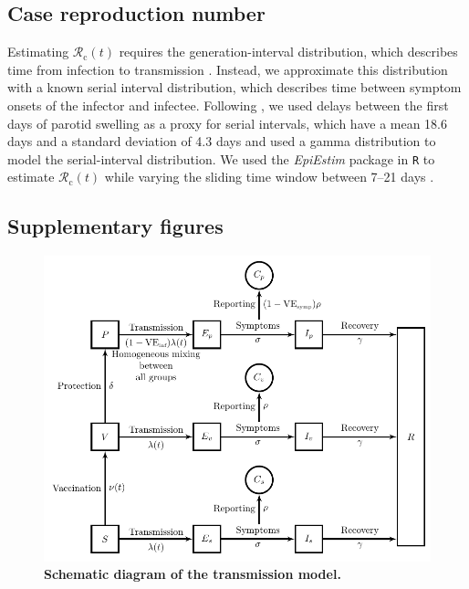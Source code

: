 \documentclass[12pt]{article}
\begin{document}
\subsection*{Case reproduction number}

Estimating $\mathcal{R}_{\mathrm c}(t)$ requires the generation-interval distribution, which describes time from infection to transmission \citep{gostic2020}. 
Instead, we approximate this distribution with a known serial interval distribution, which describes time between symptom onsets of the infector and infectee.
Following \cite{simpson1952infectiousness}, we used delays between the first days of parotid swelling as a proxy for serial intervals, which have a mean 18.6 days and a standard deviation of 4.3 days
and used a gamma distribution to model the serial-interval distribution.
We used the \textit{EpiEstim} package in \texttt{R} to estimate $\mathcal{R}_{\mathrm c}(t)$ while varying the sliding time window between 7--21 days \citep{cori2013new}.

\pagebreak

\subsection*{Supplementary figures}
\setcounter{figure}{0}
\renewcommand{\thefigure}{S\arabic{figure}}


\begin{figure}[!th]
\includegraphics[width=\textwidth]{../figure/diagram.pdf}
\caption{
\textbf{Schematic diagram of the transmission model.}
}
\label{fig:model}
\end{figure}
\end{document}
